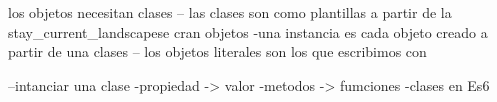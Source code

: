 los objetos necesitan clases 
-- las clases son como plantillas  a partir de la stay_current_landscapese cran objetos
-una instancia es cada objeto creado a partir de una clases
-- los objetos literales son los que escribimos con {}

    --intanciar una clase
        -propiedad -> valor
        -metodos -> fumciones
        -clases en Es6
